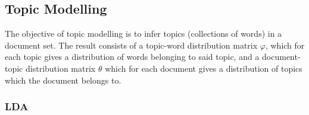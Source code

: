 \subsection{Topic Modelling}\label{subsec:topicModelling}
The objective of topic modelling is to infer topics (collections of words) in a document set.
The result consists of a topic-word distribution matrix $\varphi$, which for each topic gives a distribution of words belonging to said topic, and a document-topic distribution matrix $\theta$ which for each document gives a distribution of topics which the document belongs to.

\subsubsection{\acrlong{LDA}}\label{subsec:lda}
